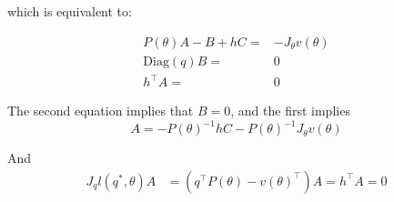 which is equivalent to:

\begin{align}
   P(\theta)A - B + hC =& -J_\theta v(\theta)\\
   \mathrm{Diag}(q)B =& 0\\
   h^\top A =& 0
\end{align}

The second equation implies that $B=0$, and the first implies
\begin{equation}
    A = - P(\theta)^{-1}hC - P(\theta)^{-1}J_\theta v(\theta)
\end{equation}

And
\begin{align}
    J_ql(q^*,\theta)A &= (q^\top P(\theta) - v(\theta)^\top )A = h^\top A = 0
\end{align}
\vskip 0.2in
